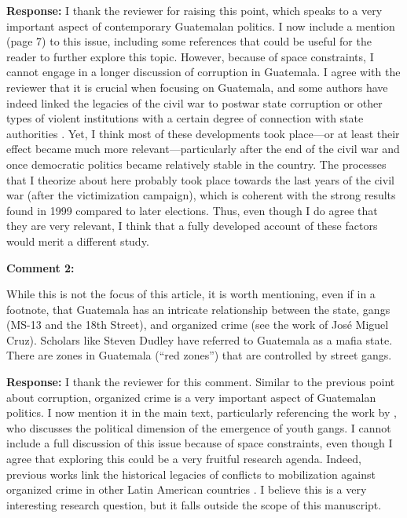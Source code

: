 \documentclass[12pt, a4paper, notitlepage]{article}
\begin{document}
\noindent\textbf{Response:} I thank the reviewer for raising this point, which speaks to a very important aspect of contemporary Guatemalan politics. I now include a mention (page 7) to this issue, including some references that could be useful for the reader to further explore this topic. However, because of space constraints, I cannot engage in a longer discussion of corruption in Guatemala. I agree with the reviewer that it is crucial when focusing on Guatemala, and some authors have indeed linked the legacies of the civil war to postwar state corruption \citep{Peacock:2003tt} or other types of violent institutions with a certain degree of connection with state authorities \citep{Bateson:2013aa}. Yet, I think most of these developments took place---or at least their effect became much more relevant---particularly after the end of the civil war and once democratic politics became relatively stable in the country.
The processes that I theorize about here probably took place towards the last years of the civil war (after the victimization campaign), which is coherent with the strong results found in 1999 compared to later elections.
Thus, even though I do agree that they are very relevant, I think that a fully developed account of these factors would merit a different study.

\vspace{15pt}
\noindent\textbf{Comment 2:}
\begin{displayquote}
While this is not the focus of this article, it is worth mentioning, even if in a footnote, that Guatemala has an intricate relationship between the state, gangs (MS-13 and the 18th Street), and organized crime (see the work of José Miguel Cruz). Scholars like Steven Dudley have referred to Guatemala as a mafia state. There are zones in Guatemala (“red zones”) that are controlled by street gangs.
\end{displayquote}

\noindent\textbf{Response:} I thank the reviewer for this comment. Similar to the previous point about corruption, organized crime is a very important aspect of Guatemalan politics. I now mention it in the main text, particularly referencing the work by \citet{Levenson:2013tm}, who discusses the political dimension of the emergence of youth gangs. I cannot include a full discussion of this issue because of space constraints, even though I agree that exploring this could be a very fruitful research agenda. Indeed, previous works link the historical legacies of conflicts to mobilization against organized crime in other Latin American countries \citep{Osorio:2021aa}. I believe this is a very interesting research question, but it falls outside the scope of this manuscript.
\end{document}
